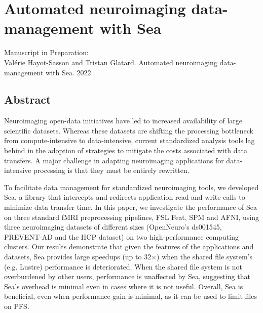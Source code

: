 \chapter{Automated neuroimaging data-management with
Sea}\label{chapter:sea-neuro}


Manuscript in Preparation:\\
Val\'erie Hayot-Sasson and Tristan Glatard. Automated neuroimaging
data-management with Sea. 2022 \\
\section{Abstract}

	Neuroimaging open-data initiatives have led to increased availability of large
  scientific datasets. Whereas these datasets are shifting the processing
  bottleneck from compute-intensive to data-intensive, current standardized
  analysis tools lag behind in the adoption of strategies to mitigate the costs
  associated with data transfers. A major challenge in adapting neuroimaging
  applications for data-intensive processing is that they must be entirely
  rewritten.
  
  To facilitate data management for standardized neuroimaging tools, we
  developed Sea, a library that intercepts and redirects application read and
  write calls to minimize data transfer time. In this paper, we investigate the
  performance of Sea on three standard fMRI preprocessing pipelines, FSL Feat,
  SPM and AFNI, using three neuroimaging datasets of different sizes
  (OpenNeuro's ds001545, PREVENT-AD and the HCP dataset) on two high-performance
  computing clusters. Our results demonstrate that given the features of the
  applications and datasets, Sea provides large speedups (up to 32$\times$) when
  the shared file system's (e.g. Lustre) performance is deteriorated. When the
  shared file system is not overburdened by other users, performance is
  unaffected by Sea, suggesting that Sea's overhead is minimal even in cases
  where it is not useful. Overall, Sea is beneficial, even when performance gain
  is minimal, as it can be used to limit files on PFS.
  
